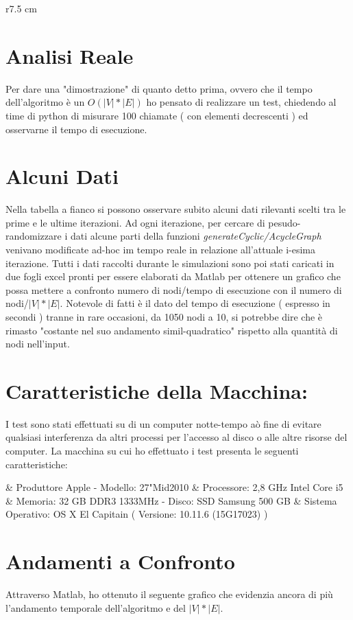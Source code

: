 \begin{wraptable}{r}{7.5 cm}
	\vspace{-10pt}
	\vspace{-10pt}
\end{wraptable} 
\section{Analisi Reale}
Per dare una "dimostrazione" di quanto detto prima, ovvero che il tempo dell'algoritmo è un $O(|V|*|E|)$ ho pensato di realizzare un test, chiedendo al time di python di misurare 100 chiamate ( con elementi decrescenti ) ed osservarne il tempo di esecuzione.
\section{Alcuni Dati}
Nella tabella a fianco si possono osservare subito alcuni dati rilevanti scelti tra le prime e le ultime iterazioni. Ad ogni iterazione, per cercare di pesudo-randomizzare i dati alcune parti della funzioni \emph{generateCyclic/AcycleGraph} venivano modificate ad-hoc im tempo reale in relazione all'attuale i-esima iterazione. Tutti i dati raccolti durante le simulazioni  sono poi stati caricati in due fogli excel pronti per essere elaborati da Matlab per ottenere un grafico che possa mettere a confronto numero di nodi/tempo di esecuzione con il numero di nodi/$|V|*|E|$. Notevole di fatti è il dato del tempo di esecuzione ( espresso in secondi ) tranne in rare occasioni, da 1050 nodi a 10, si potrebbe dire che è rimasto "costante nel suo andamento simil-quadratico" rispetto alla quantità di nodi nell'input.
\section{Caratteristiche della Macchina:}I test sono stati effettuati su di un computer notte-tempo aò fine di evitare qualsiasi interferenza da altri processi per l'accesso al disco o alle altre risorse del computer. La macchina su cui ho effettuato i test presenta le seguenti caratteristiche:
\begin{easylist}[itemize]
		& Produttore Apple -  Modello: 27"Mid2010
		& Processore: 2,8 GHz Intel Core i5
		& Memoria: 32 GB  DDR3  1333MHz - Disco: SSD Samsung 500 GB
		& Sistema Operativo: OS X El Capitain ( Versione: 10.11.6 (15G17023) )
\end{easylist}

\section{Andamenti a Confronto}
Attraverso Matlab, ho ottenuto il seguente grafico che evidenzia ancora di più l'andamento temporale dell'algoritmo e del $|V|*|E|$.\\ \\


